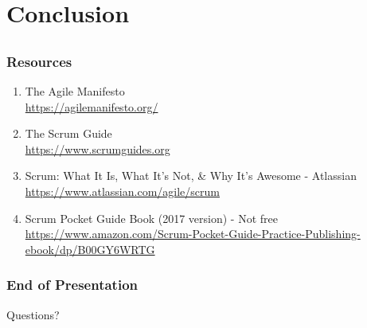 \section{Conclusion}
\subsection{}

\begin{frame}
	\frametitle{Resources}
	\begin{enumerate}
		\setlength\itemsep{0.7em}
		\item The Agile Manifesto \\
		\url{https://agilemanifesto.org/}
		\item The Scrum Guide \\
		\url{https://www.scrumguides.org}
		\item Scrum: What It Is, What It's Not, \& Why It's Awesome - Atlassian\\
		\url{https://www.atlassian.com/agile/scrum}
		\item Scrum Pocket Guide Book (2017 version) - Not free \\
		\url{https://www.amazon.com/Scrum-Pocket-Guide-Practice-Publishing-ebook/dp/B00GY6WRTG}
	\end{enumerate}
\end{frame}

\begin{frame}
	\frametitle{End of Presentation}
	Questions?
\end{frame}

